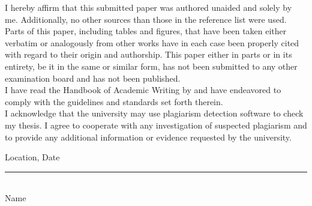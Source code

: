 \documentclass[12pt,final,a4paper,oneside]{book}
\begin{document}
I hereby affirm that this submitted paper was authored unaided and solely by
me. Additionally, no other sources than those in the reference list were used.
Parts of this paper, including tables and figures, that have been taken either verbatim or analogously from other works have in each case been properly cited
with regard to their origin and authorship.
This paper either in parts or in its entirety, be it in the same or similar form, has
not been submitted to any other examination board and has not been published.\\

\noindent
I have read the Handbook of Academic Writing by  \cite{Hildebrandt2019} and have endeavored to comply with the guidelines and standards set forth therein.\\

\noindent
I acknowledge that the university may use plagiarism detection software to check my thesis. I agree to cooperate with any investigation of suspected plagiarism and to provide any additional information or evidence requested by the university.\\\bigskip

\noindent
Location, Date\\\vspace{5em}

\noindent
\rule{20em}{1pt}\\
Name

	
\end{document}
